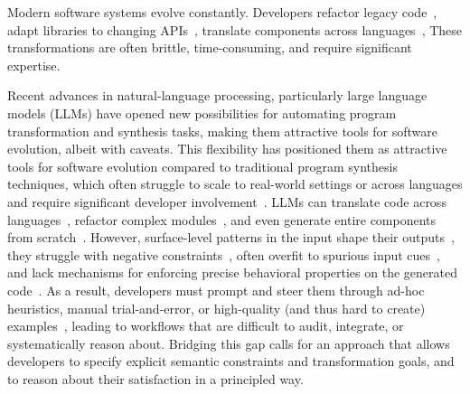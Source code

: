 \documentclass[sigplan,review,anonymous,10pt]{acmart}
\begin{document}


Modern software systems evolve constantly.
Developers refactor legacy code~\cite{Fowler99,Mens04,facebook2010redesigns,dropbox2014syncengine},
adapt libraries to changing APIs~\cite{dig2005role,kula2017empiricalstudyimpactrefactoring},
translate components across languages~\cite{manzoor_cli_python,gaultier_rewrite_cpp},
These transformations are often brittle, time-consuming, and require significant expertise.

Recent advances in natural-language processing, particularly large language
models (LLMs) have opened new possibilities for automating program
transformation and synthesis tasks,
making them attractive tools for software
evolution, albeit with caveats.
This flexibility has positioned them as attractive tools for software evolution
compared to traditional program synthesis techniques, which often struggle
to scale to real-world settings or across languages and require significant developer involvement~\cite{reynolds2019syguscomp,leino2016dafny,wu2023programming,dynamoth2016,cambronero2019active}.
LLMs can translate code across languages~\cite{ou2025enhancingllmbasedcodetranslation},
refactor complex modules~\cite{ziftci2025migrating},
and even generate entire components from scratch~\cite{huynh2025largelanguagemodelscode}.
However, surface-level patterns in the input shape their outputs~\cite{yang2025evaluatinggeneralizationcapabilitieslarge},
they struggle with negative constraints~\cite{hwang2024thinkpinkelephant,jiang2024llmsdreamelephantswhen},
often overfit to spurious input cues~\cite{xu2023llmfoolitselfpromptbased, wu2023deceptpromptexploitingllmdrivencode},
and lack mechanisms for enforcing precise behavioral properties on the generated code~\cite{roh2025breakthechainreasoningfailuresllms}.
As a result, developers must prompt and steer them through ad-hoc heuristics, manual trial-and-error, or high-quality (and thus hard to create) examples~\cite{khattab2023dspy,brown2020languagemodelsfewshotlearners},
leading to workflows that are difficult to audit, integrate, or systematically reason about.
Bridging this gap calls for an approach that allows developers to specify explicit semantic constraints and transformation goals, and to reason about their satisfaction in a principled way.
\end{document}
